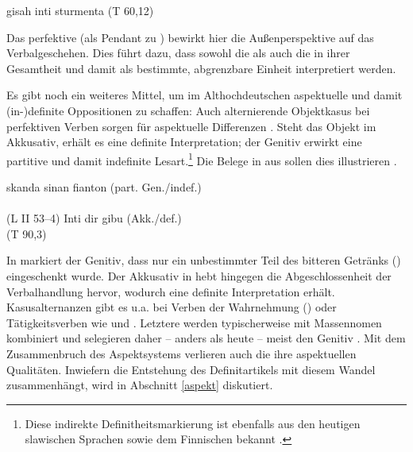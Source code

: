 \begin{exe}
	\ex \label{ex:menigi}  gisah  inti  sturmenta (T 60,12)\\ 	
\end{exe}

\noindent
Das perfektive   (als Pendant zu ) bewirkt hier die Außenperspektive auf das Verbalgeschehen. Dies führt dazu, dass sowohl die  als auch die  in ihrer Gesamtheit und damit als bestimmte, abgrenzbare Einheit interpretiert werden. 

Es gibt noch ein weiteres Mittel, um im Althochdeutschen aspektuelle und damit (in-)definite Oppositionen zu schaffen: Auch alternierende Objektkasus  bei perfektiven Verben sorgen für aspektuelle  Differenzen  \parencite{Donhauser1990,Leiss1994,Abraham1997,Philippi1997}. Steht das Objekt  im Akkusativ, erhält es eine definite  Interpretation; der Genitiv erwirkt eine partitive  und damit indefinite  Lesart.\footnote{Diese indirekte Definitheitsmarkierung  ist ebenfalls aus den heutigen slawischen Sprachen sowie dem Finnischen bekannt \parencite[74]{Philippi1997}.} Die Belege in  aus \textcite[65]{Philippi1997} sollen dies illustrieren \parencite[vgl. auch][49]{Ferraresi2014}.

\begin{exe}
	\ex \label{ex:ahd-gen-akk}
		\begin{xlist}
		\ex \label{ex:ahd-gen} skanda sinan fianton   \hfill(part. Gen./indef.) \\ 
		 \\ (L II 53--4)
		\ex \label{ex:ahd-akk} Inti dir gibu   \hfill(Akk./def.) \\   (T 90,3)
		\end{xlist}
\end{exe}
\noindent
In  markiert der Genitiv, dass nur ein unbestimmter Teil des bitteren Getränks () eingeschenkt wurde. Der Akkusativ in  hebt hingegen die Abgeschlossenheit der Verbalhandlung hervor, wodurch  eine definite Interpretation erhält. Kasusalternanzen  gibt es u.a. bei Verben der Wahrnehmung () oder Tätigkeitsverben wie  und  \parencite[s.][100]{Donhauser1990}. Letztere werden typischerweise mit Massennomen  kombiniert und selegieren daher -- anders als heute --  meist den Genitiv \parencite[36]{Abraham1997}. Mit dem Zusammenbruch des Aspektsystems  verlieren auch die  ihre aspektuellen  Qualitäten. Inwiefern die Entstehung des Definitartikels  mit diesem Wandel zusammenhängt, wird in Abschnitt \ref{aspekt} diskutiert. 
 
